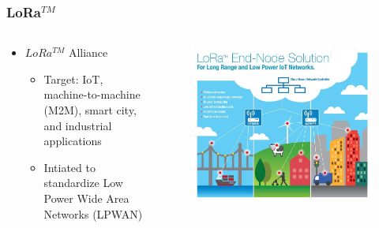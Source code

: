 \documentclass[12pt, compress]{beamer}
\begin{document}
\begin{frame}[fragile]
  \frametitle{LoRa$^{TM}$}
  \begin{columns}
    \begin{column}{.48\linewidth}
      \begin{itemize}
	\item $LoRa^{TM}$ Alliance
	\begin{itemize}
	  \item Target: IoT,  machine-to-machine (M2M), smart city, and industrial applications
	  \item Intiated to standardize Low Power Wide Area Networks (LPWAN)
	\end{itemize}
      \end{itemize}
    \end{column}
    \hfill
    \begin{column}{.48\linewidth}
    	\begin{figure}
	  \centering
	  \includegraphics[width=\linewidth]{img/lora.jpg}
    	\end{figure}

    \end{column}
  \end{columns}
\end{frame}
\end{document}

